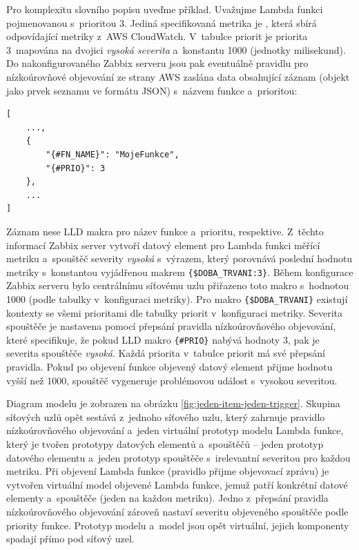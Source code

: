\documentclass[czech, ing, kiv, he, iso690]{fasthesis}
\begin{document}
Pro komplexitu slovního popisu uveďme příklad. Uvažujme Lambda funkci pojmenovanou  s~prioritou 3. Jediná specifikovaná metrika je , která sbírá odpovídající metriky z~AWS CloudWatch. V~tabulce priorit je priorita 3~mapována na dvojici \emph{vysoká severita} a~konstantu 1000 (jednotky milisekund). Do nakonfigurovaného Zabbix serveru jsou pak eventuálně pravidlu pro nízkoúrovňové objevování ze strany AWS zaslána data obsahující záznam (objekt jako prvek seznamu ve formátu JSON) s~názvem funkce a~prioritou:

\begin{verbatim}
[
    ...,
    {
        "{#FN_NAME}": "MojeFunkce",
        "{#PRIO}": 3
    },
    ...
]
\end{verbatim}

Záznam nese LLD makra pro název funkce a~prioritu, respektive. Z~těchto informací Zabbix server vytvoří datový element pro Lambda funkci měřící metriku  a~spouštěč severity \emph{vysoká} s~výrazem, který porovnává poslední hodnotu metriky s~konstantou vyjádřenou makrem \verb|{$DOBA_TRVANI:3}|. Během konfigurace Zabbix serveru bylo centrálnímu síťovému uzlu přiřazeno toto makro s~hodnotou 1000 (podle tabulky v~konfiguraci metriky). Pro makro \verb|{$DOBA_TRVANI}| existují kontexty se všemi prioritami dle tabulky priorit v~konfiguraci metriky. Severita spouštěče je nastavena pomocí přepsání pravidla nízkoúrovňového objevování, které specifikuje, že pokud LLD makro \verb|{#PRIO}| nabývá hodnoty 3, pak je severita spouštěče \emph{vysoká}. Každá priorita v~tabulce priorit má své přepsání pravidla. Pokud po objevení funkce objevený datový element přijme hodnotu vyšší než 1000, spouštěč vygeneruje problémovou událost s~vysokou severitou.

Diagram modelu  je zobrazen na obrázku \ref{fig:jeden-item-jeden-trigger}. Skupina síťových uzlů opět sestává z~jednoho síťového uzlu, který zahrnuje pravidlo nízkoúrovňového objevování a~jeden virtuální prototyp modelu Lambda funkce, který je tvořen prototypy datových elementů a~spouštěčů -- jeden prototyp datového elementu a~jeden prototyp spouštěče s~irelevantní severitou pro každou metriku. Při objevení Lambda funkce (pravidlo přijme objevovací zprávu) je vytvořen virtuální model objevené Lambda funkce, jemuž patří konkrétní datové elementy a~spouštěče (jeden na každou metriku). Jedno z~přepsání pravidla nízkoúrovňového objevování zároveň nastaví severitu objeveného spouštěče podle priority funkce. Prototyp modelu a~model jsou opět virtuální, jejich komponenty spadají přímo pod síťový uzel.
\end{document}

